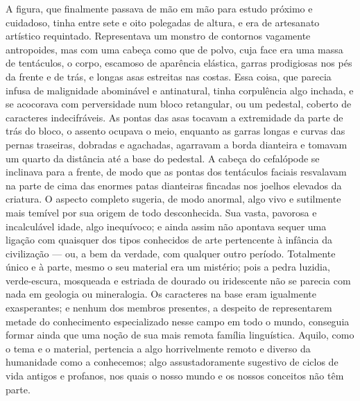 \begin{pages}
\begin{Rightside}
A figura, que finalmente passava de mão em mão para estudo próximo e
cuidadoso, tinha entre sete e oito polegadas de altura, e era de
artesanato artístico requintado. Representava um monstro de contornos
vagamente antropoides, mas com uma cabeça como que de polvo, cuja face
era uma massa de tentáculos, o corpo, escamoso de aparência elástica,
garras prodigiosas nos pés da frente e de trás, e longas asas estreitas
nas costas. Essa coisa, que parecia infusa de malignidade abominável e
antinatural, tinha corpulência algo inchada, e se acocorava com
perversidade num bloco retangular, ou um pedestal, coberto de caracteres
indecifráveis. As pontas das asas tocavam a extremidade da parte de trás
do bloco, o assento ocupava o meio, enquanto as garras longas e curvas
das pernas traseiras, dobradas e agachadas, agarravam a borda dianteira
e tomavam um quarto da distância até a base do pedestal. A cabeça do
cefalópode se inclinava para a frente, de modo que as pontas dos
tentáculos faciais resvalavam na parte de cima das enormes patas
dianteiras fincadas nos joelhos elevados da criatura. O aspecto completo
sugeria, de modo anormal, algo vivo e sutilmente mais temível por sua
origem de todo desconhecida. Sua vasta, pavorosa e incalculável idade,
algo inequívoco; e ainda assim não apontava sequer uma ligação com
quaisquer dos tipos conhecidos de arte pertencente à infância da
civilização --- ou, a bem da verdade, com qualquer outro período.
Totalmente único e à parte, mesmo o seu material era um mistério; pois a
pedra luzidia, verde-escura, mosqueada e estriada de dourado ou
iridescente não se parecia com nada em geologia ou mineralogia. Os
caracteres na base eram igualmente exasperantes; e nenhum dos membros
presentes, a despeito de representarem metade do conhecimento
especializado nesse campo em todo o mundo, conseguia formar ainda que
uma noção de sua mais remota família linguística. Aquilo, como o tema e
o material, pertencia a algo horrivelmente remoto e diverso da
humanidade como a conhecemos; algo assustadoramente sugestivo de ciclos
de vida antigos e profanos, nos quais o nosso mundo e os nossos
conceitos não têm parte.


\end{Rightside}
\end{pages}

